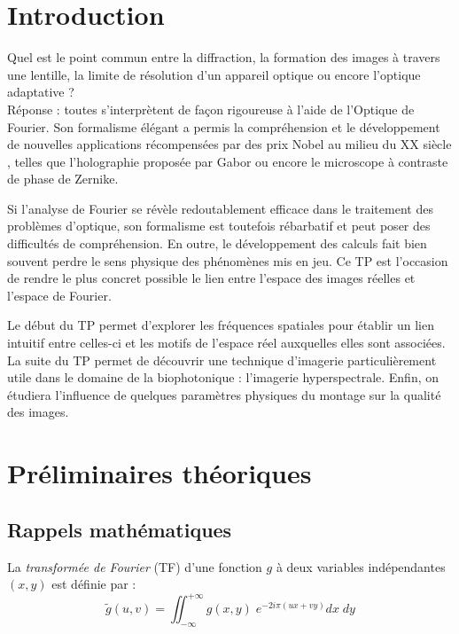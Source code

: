 \documentclass[a4paper,twoside,10pt]{book}
\newcommand{\TF}[1]{\tilde{#1}}
\renewcommand{\u}{u}
\renewcommand{\v}{v}
\begin{document}
%
%
\section*{Introduction}

Quel est le point commun entre la diffraction, la formation des images à travers une lentille, la limite de résolution d'un appareil optique ou encore l'optique adaptative ?\\
Réponse : toutes s'interprètent de façon rigoureuse à l'aide de l'Optique de Fourier. Son formalisme élégant a permis la compréhension et le développement de nouvelles applications récompensées par des prix Nobel au milieu du XX siècle , telles que l'holographie proposée par Gabor ou encore le microscope à contraste de phase de Zernike.

Si l'analyse de Fourier se révèle redoutablement efficace dans le traitement des problèmes 
d'optique, son formalisme est toutefois rébarbatif et peut poser des difficultés de compréhension. En outre, le développement des calculs fait bien souvent perdre le sens physique des phénomènes mis en jeu. Ce TP est l'occasion de rendre le plus concret possible le lien entre l'espace des images réelles et l'espace de Fourier.

Le début du TP permet d'explorer les fréquences spatiales pour établir un lien intuitif entre celles-ci et les motifs de l'espace réel auxquelles elles sont associées. La suite du TP permet de découvrir une technique d'imagerie particulièrement utile dans le domaine de la biophotonique : l'imagerie hyperspectrale. Enfin, on étudiera l'influence de quelques paramètres physiques du montage sur la qualité des images.




%
%
\section{Préliminaires théoriques}

\subsection{Rappels mathématiques}

La \emph{transformée de Fourier} (TF) d'une fonction $g$ à deux variables indépendantes $(x, y)$ est définie par :
\begin{equation}\label{eq:defTF}
\TF{g}(\u,\v) = \iint_{-\infty}^{+\infty} g(x, y) \; e^{-2i\pi(\u x + \v y)} dx \; dy
\end{equation}
\end{document}
